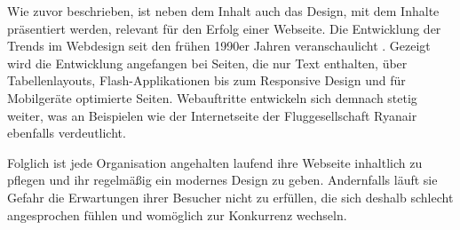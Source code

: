     Wie zuvor beschrieben, ist neben dem Inhalt auch das Design,
    mit dem Inhalte präsentiert werden, relevant für den Erfolg einer Webseite.
    Die Entwicklung der Trends im Webdesign seit den frühen 1990er Jahren veranschaulicht
    \cite{work:webDesignEvolution}.
    Gezeigt wird die Entwicklung angefangen bei Seiten, die nur Text enthalten,
    über Tabellenlayouts, Flash-Applikationen bis zum Responsive Design und für
    Mobilgeräte optimierte Seiten.
    Webauftritte entwickeln sich demnach stetig weiter,
    was \cite{murphy:webDesignEvolution} an Beispielen wie der Internetseite der
    Fluggesellschaft Ryanair ebenfalls verdeutlicht.

    Folglich ist jede Organisation angehalten laufend ihre Webseite inhaltlich zu pflegen
    und ihr regelmäßig ein modernes Design zu geben.
    Andernfalls läuft sie Gefahr die Erwartungen ihrer Besucher nicht zu erfüllen,
    die sich deshalb schlecht angesprochen fühlen und womöglich zur Konkurrenz wechseln.